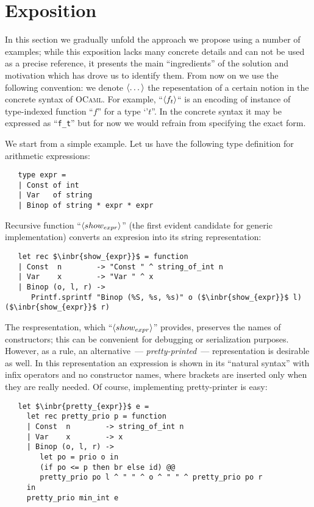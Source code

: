 \section{Exposition}
\label{expo}

In this section we gradually unfold the approach we propose using a number of examples; while this exposition lacks many concrete details and can not be used as a
precise reference, it presents the main ``ingredients'' of the solution and motivation which has drove us to identify them. From now on we use the following
convention: we denote $\left<\dots\right>$ the repesentation of a certain notion in the concrete syntax of \textsc{OCaml}. For example, ``$\left<f_t\right>$`` is an encoding of instance
of type-indexed function ``$f$'' for a type `'$t$''. In the concrete syntax it may be expressed as ``\lstinline{f_t}'' but for now we would refrain from specifying
the exact form.

We start from a simple example. Let us have the following type definition for arithmetic expressions:

\begin{lstlisting}
   type expr =
   | Const of int
   | Var   of string
   | Binop of string * expr * expr
\end{lstlisting}

Recursive function ``$\left<show_{expr}\right>$'' (the first evident candidate for generic implementation) converts an expresion into its string representation: 

\begin{lstlisting}
   let rec $\inbr{show_{expr}}$ = function
   | Const  n        -> "Const " ^ string_of_int n
   | Var    x        -> "Var " ^ x
   | Binop (o, l, r) ->
      Printf.sprintf "Binop (%S, %s, %s)" o ($\inbr{show_{expr}}$ l) ($\inbr{show_{expr}}$ r)
\end{lstlisting}

The respresentation, which ``$\left<show_{expr}\right>$'' provides, preserves the names of constructors; this can be convenient for debugging or
serialization purposes. However, as a rule, an alternative~--- \emph{pretty-printed}~--- representation is desirable as well. In this
representation an expression is shown in its ``natural syntax'' with infix operators and no constructor names, where brackets are
inserted only when they are really needed. Of course, implementing pretty-printer is easy:

\begin{lstlisting}
   let $\inbr{pretty_{expr}}$ e =
     let rec pretty_prio p = function
     | Const  n        -> string_of_int n
     | Var    x        -> x
     | Binop (o, l, r) ->
        let po = prio o in
        (if po <= p then br else id) @@
        pretty_prio po l ^ " " ^ o ^ " " ^ pretty_prio po r
     in
     pretty_prio min_int e
\end{lstlisting}

